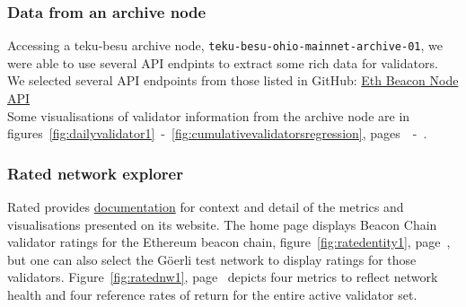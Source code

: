 \documentclass[UTF8]{article}
\begin{document}
\subsubsection*{Data from an archive node}
Accessing a teku-besu archive node, \texttt{teku-besu-ohio-mainnet-archive-01},  we were able to use several API endpints to extract some rich data for validators.\\
	 We selected several API endpoints from those listed in GitHub: \href{https://ethereum.github.io/beacon-APIs/?urls.primaryName=dev}{Eth Beacon Node API}\\
	 Some visualisations of validator information from the archive node are in figures~\ref{fig:dailyvalidator1}~-~\ref{fig:cumulativevalidatorsregression}, pages~\pageref{fig:dailyvalidator1}~-~\pageref{fig:cumulativevalidatorsregression}.
	 
\subsubsection*{Rated network explorer}
Rated provides \href{https://docs.rated.network}{documentation} for context and detail of the metrics and visualisations presented on its website.
	 The home page displays Beacon Chain validator ratings for the Ethereum beacon chain, figure~\ref{fig:ratedentity1}, page~\pageref{fig:ratedentity1}, but one can also select the G\"oerli test network to display ratings for those validators.
Figure~\ref{fig:ratednw1}, page~\pageref{fig:ratednw1} depicts four metrics to reflect network health and four reference rates of return for the entire active validator set.


\end{document}
